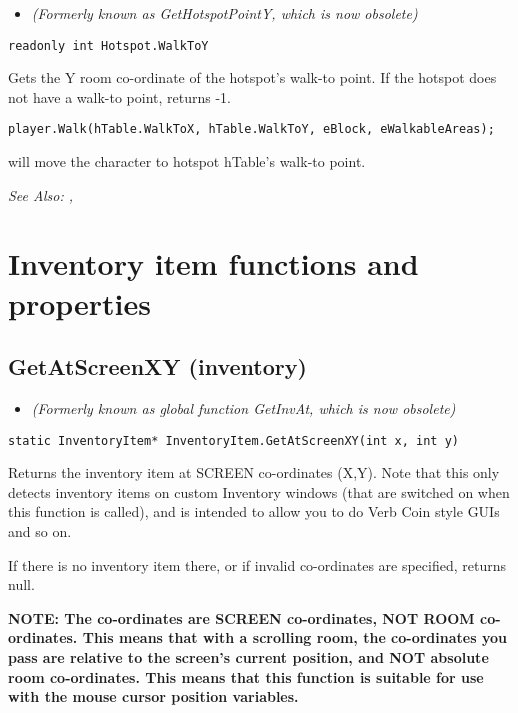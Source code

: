 \begin{itemize}
\item \it{(Formerly known as GetHotspotPointY, which is now obsolete)}
\end{itemize}

\begin{verbatim}
readonly int Hotspot.WalkToY
\end{verbatim}
Gets the Y room co-ordinate of the hotspot's walk-to point. If the hotspot
does not have a walk-to point, returns -1.

\begin{verbatim}
player.Walk(hTable.WalkToX, hTable.WalkToY, eBlock, eWalkableAreas);
\end{verbatim}
will move the character to hotspot hTable's walk-to point.

\it{See Also:} ,



\section{Inventory item functions and properties}%


\subsection{GetAtScreenXY (inventory)}\label{InventoryItem.GetAtScreenXY}%

\begin{itemize}
\item \it{(Formerly known as global function GetInvAt, which is now obsolete)}
\end{itemize}

\begin{verbatim}
static InventoryItem* InventoryItem.GetAtScreenXY(int x, int y)
\end{verbatim}
Returns the inventory item at SCREEN co-ordinates (X,Y). Note that this
only detects inventory items on custom Inventory windows (that are switched on when
this function is called), and is intended to allow you to do Verb Coin style GUIs and so on.

If there is no inventory item there, or if invalid co-ordinates are specified,
returns null.

\bf{NOTE:} The co-ordinates are SCREEN co-ordinates, NOT ROOM co-ordinates. This
means that with a scrolling room, the co-ordinates you pass are relative to
the screen's current position, and NOT absolute room co-ordinates. This
means that this function is suitable for use with the mouse cursor position
variables.

